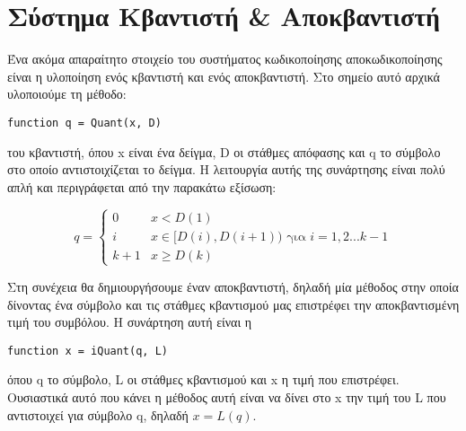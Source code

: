 \section{Σύστημα Κβαντιστή \& Αποκβαντιστή}

\par Ένα ακόμα απαραίτητο στοιχείο του συστήματος κωδικοποίησης αποκωδικοποίησης
είναι η υλοποίηση ενός κβαντιστή και ενός αποκβαντιστή. Στο σημείο αυτό αρχικά υλοποιούμε
τη μέθοδο:
\begin{lstlisting}[style=myMatlab]
  function q = Quant(x, D)
\end{lstlisting}
\noindent του κβαντιστή, όπου x είναι ένα δείγμα, D οι στάθμες απόφασης και q
το σύμβολο στο οποίο αντιστοιχίζεται το δείγμα. Η λειτουργία αυτής της συνάρτησης είναι πολύ απλή και
περιγράφεται από την παρακάτω εξίσωση:

\begin{equation}
q =
\begin{cases}
0  &    x < D(1) \\
i  & x\in[D(i), D(i+1)) \mbox{ για }  i = 1,2...k-1 \\
k+1 & x \geq D(k)
\end{cases}
\end{equation}

\par Στη συνέχεια θα δημιουργήσουμε έναν αποκβαντιστή, δηλαδή μία μέθοδος
στην οποία δίνοντας ένα σύμβολο και τις στάθμες κβαντισμού μας επιστρέφει την
αποκβαντισμένη τιμή του συμβόλου. Η συνάρτηση αυτή είναι η
\begin{lstlisting}[style=myMatlab]
  function x = iQuant(q, L)
\end{lstlisting}
\noindent όπου
q το σύμβολο, L οι στάθμες κβαντισμού και x η τιμή που επιστρέφει. Ουσιαστικά αυτό
που κάνει η μέθοδος αυτή είναι να δίνει στο x την τιμή του L που αντιστοιχεί για
σύμβολο q, δηλαδή $x = L(q)$.

